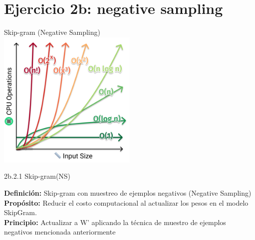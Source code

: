 \documentclass{beamer}
\begin{document}
\section{Ejercicio 2b: negative sampling}

\begin{frame}{}
	\centering
	\Large Skip-gram (Negative Sampling)\\
	\vspace{0.8cm}
	\includegraphics[width=0.5\textwidth]{big-o}
\end{frame}

\begin{frame}[fragile]{2b.2.1 Skip-gram(NS)}
	\begin{block}{\textbf{Definición:} Skip-gram con muestreo de ejemplos negativos (Negative Sampling)}
		\justifying
		\vspace{0.1cm}
		\textbf{Propósito:} Reducir el costo computacional al actualizar los pesos en el modelo SkipGram.\\
		\vspace{0.1cm}
		\textbf{Principio:} Actualizar a W' aplicando la técnica de muestro de ejemplos negativos mencionada anteriormente\\
	\end{block}
\end{frame}
\end{document}
